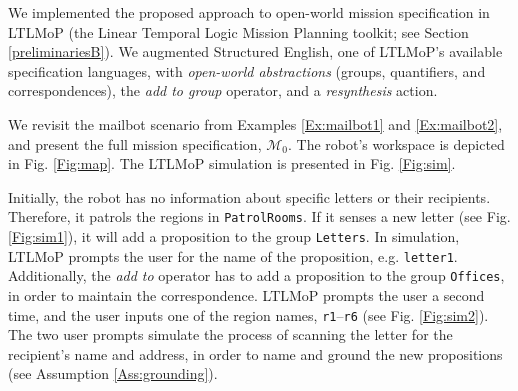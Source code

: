 We implemented the proposed approach to open-world mission specification in LTLMoP (the Linear Temporal Logic Mission Planning toolkit; see Section \ref{preliminariesB}). We augmented Structured English, one of LTLMoP's available specification languages, with \emph{open-world abstractions} (groups, quantifiers, and correspondences), the \emph{add to group} operator, and a \emph{resynthesis} action.

\begin{myExample}\label{Ex:mailbot3} We revisit the mailbot scenario from Examples \ref{Ex:mailbot1} and \ref{Ex:mailbot2}, and present the full mission specification, $\mathcal{M}_0$. The robot's workspace is depicted in Fig. \ref{Fig:map}. The LTLMoP simulation is presented in Fig. \ref{Fig:sim}.
\end{myExample}

Initially, the robot has no information about specific letters or their recipients. Therefore, it patrols the regions in \texttt{PatrolRooms}. If it senses a new letter (see Fig. \ref{Fig:sim1}), it will add a proposition to the group \texttt{Letters}. In simulation, LTLMoP prompts the user for the name of the proposition, e.g. \texttt{letter1}. Additionally, the \emph{add to} operator has to add a proposition to the group \texttt{Offices}, in order to maintain the correspondence. LTLMoP prompts the user a second time, and the user inputs one of the region names, \texttt{r1}--\texttt{r6} (see Fig. \ref{Fig:sim2}). The two user prompts simulate the process of scanning the letter for the recipient's name and address, in order to name and ground the new propositions (see Assumption \ref{Ass:grounding}).

